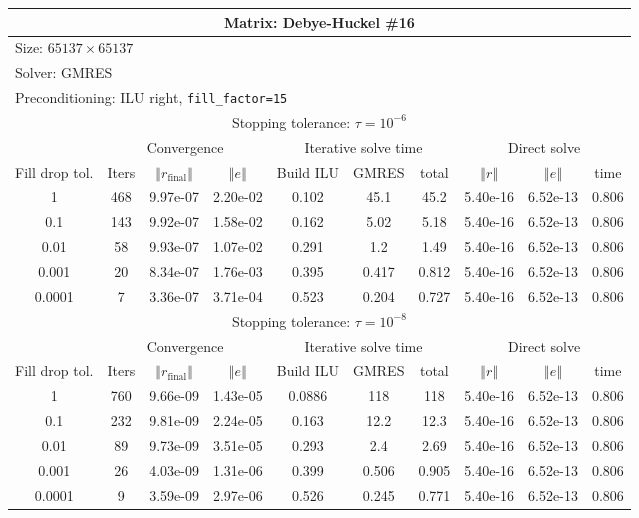 \documentclass[oneside,final]{amsart}  %
\begin{document}
\begin{tabular}{|c|c|c|c|c|c|c|c|c|c|}
\hline
\multicolumn{10}{|c|}{Matrix: Debye-Huckel \#16}\tabularnewline
\hline
  \multicolumn{10}{|l|}{Size: $65137\times65137$}\tabularnewline
\hline
\multicolumn{10}{|l|}{Solver: GMRES}\tabularnewline
\hline
\multicolumn{10}{|l|}{Preconditioning: ILU right, \texttt{fill\_factor=15}}\tabularnewline
\hline
\hline
\multicolumn{10}{|c|}{Stopping tolerance: $\tau=10^{-6}$}\tabularnewline
\hline
\hline
 & \multicolumn{3}{c|}{Convergence} & \multicolumn{3}{c|}{Iterative solve time} & \multicolumn{3}{c|}{Direct solve}\tabularnewline
\hline
Fill drop tol.  & Iters & $\left\Vert r_{\text{final}}\right\Vert $  & $\left\Vert e\right\Vert $  & Build ILU  & GMRES  & total  & $\left\Vert r\right\Vert $ & $\left\Vert e\right\Vert $  & time\tabularnewline
\hline
1      & 468 & 9.97e-07 & 2.20e-02 &   0.102 &    45.1 &    45.2 & 5.40e-16 & 6.52e-13 &     0.806\\
\hline
0.1    & 143 & 9.92e-07 & 1.58e-02 &   0.162 &    5.02 &    5.18 & 5.40e-16 & 6.52e-13 &     0.806\\
\hline
0.01   & 58  & 9.93e-07 & 1.07e-02 &   0.291 &     1.2 &    1.49 & 5.40e-16 & 6.52e-13 &     0.806\\
\hline
0.001  & 20  & 8.34e-07 & 1.76e-03 &   0.395 &   0.417 &   0.812 & 5.40e-16 & 6.52e-13 &     0.806\\
\hline
0.0001 & 7   & 3.36e-07 & 3.71e-04 &   0.523 &   0.204 &   0.727 & 5.40e-16 & 6.52e-13 &     0.806\\
\hline
\hline
\multicolumn{10}{|c|}{Stopping tolerance: $\tau=10^{-8}$}\tabularnewline
\hline
\hline
 & \multicolumn{3}{c|}{Convergence} & \multicolumn{3}{c|}{Iterative solve time} & \multicolumn{3}{c|}{Direct solve }\tabularnewline
\hline
Fill drop tol.  & Iters  & $\left\Vert r_{\text{final}}\right\Vert $  & $\left\Vert e\right\Vert $ & Build ILU  & GMRES  & total  & $\left\Vert r\right\Vert $  & $\left\Vert e\right\Vert $  & time\tabularnewline
\hline
1      & 760 & 9.66e-09 & 1.43e-05 &  0.0886 &     118 &     118 & 5.40e-16 & 6.52e-13 &     0.806\\
  \hline
0.1    & 232 & 9.81e-09 & 2.24e-05 &   0.163 &    12.2 &    12.3 & 5.40e-16 & 6.52e-13 &     0.806\\
  \hline
0.01   & 89  & 9.73e-09 & 3.51e-05 &   0.293 &     2.4 &    2.69 & 5.40e-16 & 6.52e-13 &     0.806\\
  \hline
0.001  & 26  & 4.03e-09 & 1.31e-06 &   0.399 &   0.506 &   0.905 & 5.40e-16 & 6.52e-13 &     0.806\\
  \hline
0.0001 & 9   & 3.59e-09 & 2.97e-06 &   0.526 &   0.245 &   0.771 & 5.40e-16 & 6.52e-13 &     0.806\\
  \hline
\end{tabular}
\end{document}
